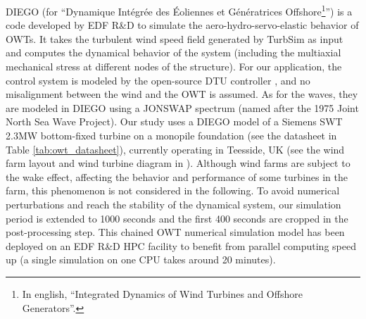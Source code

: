 DIEGO (for ``Dynamique Intégrée des Éoliennes et Génératrices Offshore\footnote{In english, ``Integrated Dynamics of Wind Turbines and Offshore Generators''.}'') is a code developed by EDF R\&D \citep{kim_natarajan_2022} to simulate the aero-hydro-servo-elastic behavior of OWTs. 
It takes the turbulent wind speed field generated by TurbSim as input and computes the dynamical behavior of the system (including the multiaxial mechanical stress at different nodes of the structure). 
For our application, the control system is modeled by the open-source DTU controller \citep{dtu_controler_2013}, and no misalignment between the wind and the OWT is assumed. 
As for the waves, they are modeled in DIEGO using a JONSWAP spectrum (named after the 1975 Joint North Sea Wave Project). 
Our study uses a DIEGO model of a Siemens SWT 2.3MW bottom-fixed turbine on a monopile foundation (see the datasheet in Table \ref{tab:owt_datasheet}), currently operating in Teesside, UK (see the wind farm layout and wind turbine diagram in ). 
Although wind farms are subject to the wake effect, affecting the behavior and performance of some turbines in the farm, this phenomenon is not considered in the following. 
To avoid numerical perturbations and reach the stability of the dynamical system, our simulation period is extended to 1000 seconds and the first 400 seconds are cropped in the post-processing step. 
This chained OWT numerical simulation model has been deployed on an EDF R\&D HPC facility to benefit from parallel computing speed up (a single simulation on one CPU takes around 20 minutes).

